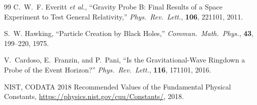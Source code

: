 \documentclass[12pt]{article}
\begin{document}
\begin{thebibliography}{99}
C.~W.~F. Everitt \textit{et al.},
``Gravity Probe B: Final Results of a Space Experiment to Test
General Relativity,''
\textit{Phys.\ Rev.\ Lett.}, \textbf{106}, 221101, 2011.

S.~W. Hawking,
``Particle Creation by Black Holes,''
\textit{Commun.\ Math.\ Phys.}, \textbf{43}, 199--220, 1975.

V.~Cardoso, E.~Franzin, and P.~Pani,
``Is the Gravitational-Wave Ringdown a Probe of the Event Horizon?''
\textit{Phys.\ Rev.\ Lett.}, \textbf{116}, 171101, 2016.

NIST, CODATA 2018 Recommended Values of the Fundamental Physical
Constants, \url{https://physics.nist.gov/cuu/Constants/}, 2018.

\end{thebibliography}
\end{document}
